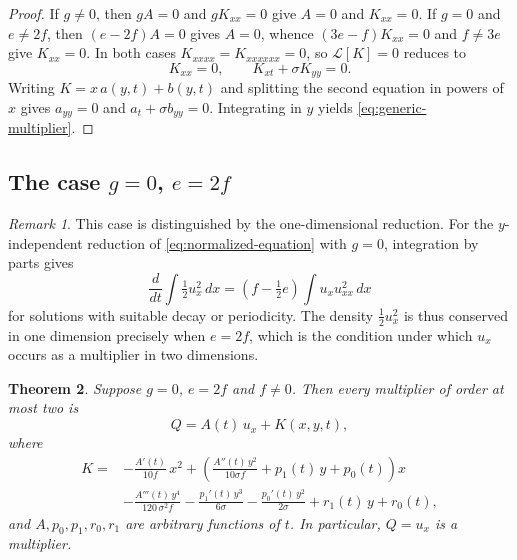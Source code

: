\documentclass[11pt]{article}
\numberwithin{equation}{section}
\newtheorem{theorem}{Theorem}[section]
\theoremstyle{definition}
\theoremstyle{remark}
\newtheorem{remark}[theorem]{Remark}
\begin{document}
\begin{proof}
If $g\neq0$, then $gA=0$ and $gK_{xx}=0$ give $A=0$ and $K_{xx}=0$.
If $g=0$ and $e\neq2f$, then $(e-2f)A=0$ gives $A=0$, whence
$(3e-f)K_{xx}=0$ and $f\neq3e$ give $K_{xx}=0$. In both cases
$K_{xxxx}=K_{xxxxxx}=0$, so $\mathcal{L}[K]=0$ reduces to
\begin{equation}
K_{xx}=0,
\qquad
K_{xt} + \sigma K_{yy} = 0 .
\label{eq:generic-system}
\end{equation}
Writing $K = x\,a(y,t) + b(y,t)$ and splitting the second equation in
powers of $x$ gives $a_{yy}=0$ and $a_t + \sigma b_{yy} = 0$.
Integrating in $y$ yields \eqref{eq:generic-multiplier}.
\end{proof}
\subsection{The case \texorpdfstring{$g=0$, $e=2f$}{g=0, e=2f}}
\begin{remark}
\label{rem:e2f-reduction}
This case is distinguished by the one-dimensional reduction. For the
$y$-independent reduction of \eqref{eq:normalized-equation} with
$g=0$, integration by parts gives
\begin{equation}
\frac{d}{dt}\int \tfrac12 u_x^2 \,dx
= \left(f - \tfrac12 e\right)\int u_x u_{xx}^2 \,dx
\label{eq:1d-gradient-energy}
\end{equation}
for solutions with suitable decay or periodicity. The density
$\tfrac12 u_x^2$ is thus conserved in one dimension precisely when
$e=2f$, which is the condition under which $u_x$ occurs as a
multiplier in two dimensions.
\end{remark}
\begin{theorem}
\label{thm:e-2f}
Suppose $g=0$, $e=2f$ and $f\neq0$. Then every multiplier of order at
most two is
\begin{equation}
Q = A(t)\,u_x + K(x,y,t),
\label{eq:e2f-multiplier}
\end{equation}
where
\begin{equation}
\begin{aligned}
K = {}&
-\frac{A'(t)}{10f}\,x^2
+ \left(
\frac{A''(t)\,y^2}{10\sigma f}
+ p_1(t)\,y + p_0(t)
\right) x
\\
&- \frac{A'''(t)\,y^4}{120\,\sigma^2 f}
- \frac{p_1'(t)\,y^3}{6\sigma}
- \frac{p_0'(t)\,y^2}{2\sigma}
+ r_1(t)\,y + r_0(t),
\end{aligned}
\label{eq:e2f-K}
\end{equation}
and $A,p_0,p_1,r_0,r_1$ are arbitrary functions of $t$. In
particular, $Q=u_x$ is a multiplier.
\end{theorem}
\end{document}
